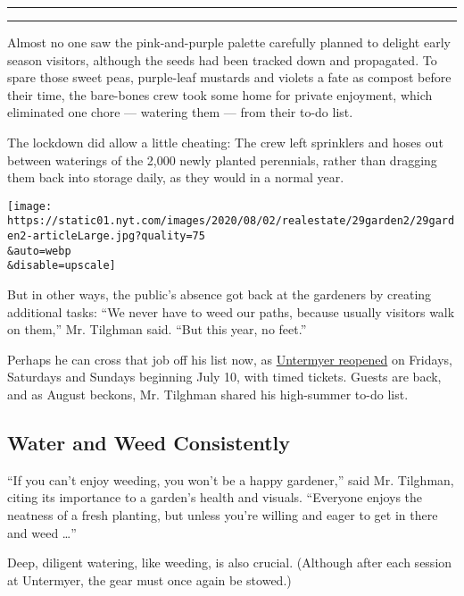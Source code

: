 \begin{center}\rule{0.5\linewidth}{\linethickness}\end{center}

\begin{center}\rule{0.5\linewidth}{\linethickness}\end{center}

Almost no one saw the pink-and-purple palette carefully planned to
delight early season visitors, although the seeds had been tracked down
and propagated. To spare those sweet peas, purple-leaf mustards and
violets a fate as compost before their time, the bare-bones crew took
some home for private enjoyment, which eliminated one chore --- watering
them --- from their to-do list.

The lockdown did allow a little cheating: The crew left sprinklers and
hoses out between waterings of the 2,000 newly planted perennials,
rather than dragging them back into storage daily, as they would in a
normal year.

\texttt{[image: https://static01.nyt.com/images/2020/08/02/realestate/29garden2/29garden2-articleLarge.jpg?quality=75\\\&auto=webp\\\&disable=upscale]}

But in other ways, the public's absence got back at the gardeners by
creating additional tasks: ``We never have to weed our paths, because
usually visitors walk on them,'' Mr. Tilghman said. ``But this year, no
feet.''

Perhaps he can cross that job off his list now, as
\href{https://www.untermyergardens.org/visit.html}{Untermyer reopened}
on Fridays, Saturdays and Sundays beginning July 10, with timed tickets.
Guests are back, and as August beckons, Mr. Tilghman shared his
high-summer to-do list.

\hypertarget{water-and-weed-consistently}{%
\subsection{Water and Weed
Consistently}\label{water-and-weed-consistently}}

``If you can't enjoy weeding, you won't be a happy gardener,'' said Mr.
Tilghman, citing its importance to a garden's health and visuals.
``Everyone enjoys the neatness of a fresh planting, but unless you're
willing and eager to get in there and weed \ldots{}''

Deep, diligent watering, like weeding, is also crucial. (Although after
each session at Untermyer, the gear must once again be stowed.)

